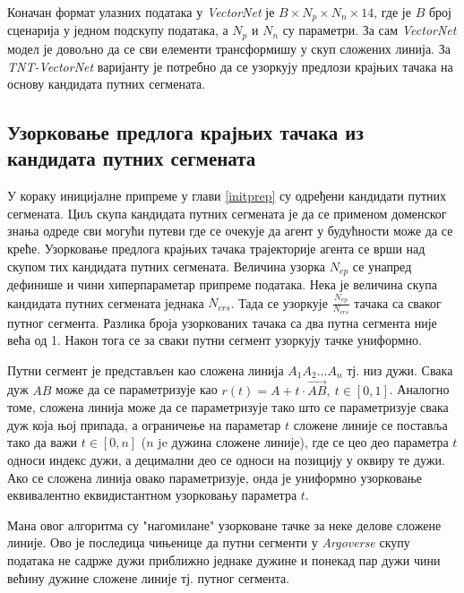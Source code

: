 \documentclass[11pt,oneside]{memoir}
\begin{document}
Коначан формат улазних података у \textit{VectorNet} је $B\times N_{p}\times N_{n}\times 14$, где је $B$ број сценарија у једном подскупу података,
а $N_{p}$ и $N_{n}$ су параметри. За сам \textit{VectorNet} модел је довољно да се сви елементи трансформишу у скуп сложених линија. За
\textit{TNT-VectorNet} варијанту је потребно да се узоркују предлози крајњих тачака на основу кандидата путних сегмената. 

\subsection{Узорковање предлога крајњих тачака из кандидата путних сегмената}

У кораку иницијалне припреме у глави \ref{initprep} су одређени кандидати путних сегмената. Циљ скупа кандидата путних сегмената је да се применом доменског знања
одреде сви могући путеви где се очекује да агент у будућности може да се креће. Узорковање предлога крајњих тачака трајекторије агента се врши над
скупом тих кандидата путних сегмената. Величина узорка $N_{ep}$ се унапред дефинише и чини хиперпараметар припреме података. Нека је величина скупа
кандидата путних сегмената једнака $N_{crs}$. Тада се узоркује $\frac{N_{ep}}{N_{crs}}$ тачака са сваког путног сегмента. Разлика броја
узоркованих тачака са два путна сегмента није већа од 1. Након тога се за сваки путни сегмент узоркују тачке униформно. 

Путни сегмент је представљен као сложена линија $A_{1}A_{2}...A_{n}$ тј. низ дужи. Свака дуж $AB$ може да се параметризује као 
$r(t) = A + t\cdot \vec{AB},\ t \in [0, 1]$. Аналогно томе, сложена линија може да се параметризује тако што се параметризује свака дуж која њој припада,
а ограничење на параметар $t$ сложене линије се поставља тако да важи $t \in [0, n]$ ($n$ je дужина сложене линије), где се цео део параметра $t$ односи индекс дужи, а децимални
део се односи на позицију у оквиру те дужи. Ако се сложена линија овако параметризује, онда је униформно узорковање еквивалентно еквидистантном узорковању
параметра $t$. 

Мана овог алгоритма су "нагомилане" узорковане тачке за неке делове сложене линије. Ово је последица чињенице да путни сегменти у \textit{Argoverse} 
скупу података не садрже дужи приближно једнаке дужине и понекад пар дужи чини већину дужине сложене линије тј. путног сегмента. 
\end{document}
